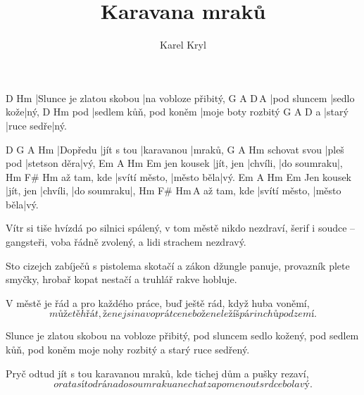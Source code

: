 \documentclass{song}
\title{Karavana mraků}
\author{Karel Kryl}
\begin{document}
\strophe
D                        Hm
|Slunce je zlatou skobou |na vobloze přibitý,
G            A          D\,A\7
|pod sluncem |sedlo kože|ný,
    D                      Hm
pod |sedlem kůň, pod koněm |moje boty rozbitý
  G      A          D
a |starý |ruce sedře|ný.
\endstrophe

D\7      G          A          Hm
|Dopředu |jít s tou |karavanou |mraků,
             G         A            Hm
schovat svou |pleš pod |stetson děra|vý,
           Em        A\7      Hm          Em
jen kousek |jít, jen |chvíli, |do soumraku|,
			Hm            F\#        Hm
až tam, kde |svítí město, |město běla|vý.
           Em        A\7      Hm          Em
Jen kousek |jít, jen |chvíli, |do soumraku|,
			Hm            F\#        Hm\,A\7
až tam, kde |svítí město, |město běla|vý.
\endstrophe

\strophe*
Vítr si tiše hvízdá po silnici spálený,
v tom městě nikdo nezdraví,
šerif i soudce -- gangsteři, voba řádně zvolený,
a lidi strachem nezdravý.
\endstrophe

\strophe*
Sto cizejch zabíječů s pistolema skotačí
a zákon džungle panuje,
provazník plete smyčky, hrobař kopat nestačí
a truhlář rakve hobluje.
\endstrophe

V městě je řád a pro každého práce,
buď ještě rád, když huba voněmí,
\[ může tě hřát, že nejsi na voprátce
nebo že neležíš pár inchů pod zemí. \]
\endstrophe

\strophe*
Slunce je zlatou skobou na vobloze přibitý,
pod sluncem sedlo kožený,
pod sedlem kůň, pod koněm moje nohy rozbitý
a starý ruce sedřený.
\endstrophe

Pryč odtud jít s tou karavanou mraků,
kde tichej dům a pušky rezaví,
\[ orat a sít od rána do soumraku
a nechat zapomenout srdce bolavý. \]
\endstrophe
\end{document}
